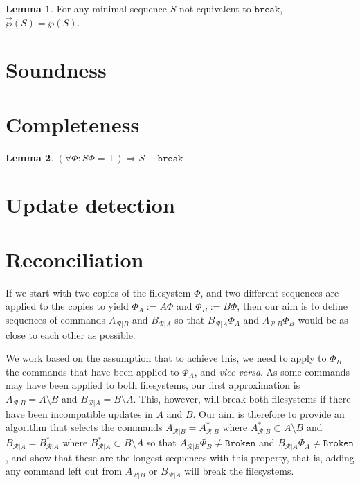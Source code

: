 \documentclass[12pt]{article}
\newcommand{\empt}{\bot}
\newcommand{\fsbroken}{\mathtt{Broken}} %
\newcommand{\FS}{\Phi} %
\newcommand{\cbrk}{\mathtt{break}}
\newcommand{\extset}[1]{\wp({#1})}
\newcommand{\orderset}[1]{\vec{\wp}({#1})}
\newcommand{\ordered}[1]{#1}
\newcommand{\recchar}[3]{{#1}^{#3}_{\mathcal{R}|{#2}}}
\newcommand{\reca}{\recchar{A}{B}{}} %
\newcommand{\recb}{\recchar{B}{A}{}}
\newcommand{\recaset}{\recchar{A}{B}{*}}
\newcommand{\recbset}{\recchar{B}{A}{*}}
\theoremstyle{definition}
\newtheorem{mylem}{Lemma}
\begin{document}
\begin{mylem}\label{lemma:minextorder}
For any minimal sequence $S$ not equivalent to $\cbrk$,
$\orderset{S} = \extset{S}$.
\end{mylem}


\section{Soundness}

\section{Completeness}

\begin{mylem}
\((\forall\FS: S\FS = \empt) \Rightarrow S \equiv \cbrk\)
\end{mylem}

\section{Update detection}

\section{Reconciliation}

If we start with two copies of the filesystem $\FS$,
and two different sequences are applied to the copies to yield $\FS_A:=A\FS$
and $\FS_B:=B\FS$, then our aim is to define sequences of commands $\reca$ and $\recb$
so that $\recb\FS_A$ and $\reca\FS_B$ would be as close to each other as possible.

We work based on the assumption that to achieve this, we need
to apply to $\FS_B$ the commands that have been applied to $\FS_A$, and \emph{vice versa}.
As some commands may have been applied to both filesystems, our first approximation
is $\reca = \ordered{A\setminus B}$ and $\recb = \ordered{B\setminus A}$.
This, however, will break both filesystems if there have been incompatible updates
in $A$ and $B$. 
Our aim is therefore to provide an algorithm that selects the commands 
$\reca = \ordered{\recaset}$  where $\recaset \subset A\setminus B$
and $\recb = \ordered{\recbset}$ where $\recbset \subset B\setminus A$ 
so that $\reca\FS_B\neq\fsbroken$ and $\recb\FS_A\neq\fsbroken$,
and show that these are the longest sequences with this property, that is,
adding any command left out from $\reca$ or $\recb$ will break the filesystems.
\end{document}
